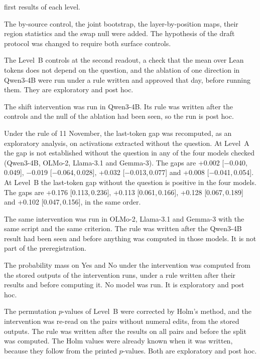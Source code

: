 \documentclass[10pt]{article}
\newcommand{\ic}[2]{[#1,\,#2]}
\begin{document}
\begin{description}[leftmargin=1.2em]
first results of each level.
\item[9 Nov] The by-source control, the joint bootstrap, the layer-by-position maps, their region statistics and
the swap null were added. The hypothesis of the draft protocol was changed to require both surface controls.
\item[11 Nov] The Level~B controls at the second readout, a check that the mean over Lean tokens does not depend on
the question, and the ablation of one direction in Qwen3-4B were run under a rule written and approved that day,
before running them. They are exploratory and post hoc.
\item[11--12 Nov] The shift intervention was run in Qwen3-4B. Its rule was written after the controls and the null of
the ablation had been seen, so the run is post hoc.
\item[12 Nov] Under the rule of 11 November, the last-token gap was recomputed, as an exploratory analysis, on activations
extracted without the question. At Level~A the gap is not established without the question in any of the four models checked (Qwen3-4B, OLMo-2, Llama-3.1 and Gemma-3). The gaps are +0.002
\ic{−0.040}{0.049}, −0.019 \ic{−0.064}{0.028}, +0.032 \ic{−0.013}{0.077} and +0.008 \ic{−0.041}{0.054}. At Level~B the last-token gap without the question is positive in the four models. The gaps are +0.176 \ic{0.113}{0.236}, +0.113 \ic{0.061}{0.166}, +0.128 \ic{0.067}{0.189} and +0.102 \ic{0.047}{0.156}, in the same order.
\item[12--13 Nov] The same intervention was run in OLMo-2, Llama-3.1 and Gemma-3 with the same script and the same
criterion. The rule was written after the Qwen3-4B result had been seen and before anything was computed in those
models. It is not part of the preregistration.
\item[13 Nov] The probability mass on Yes and No under the intervention was computed from the stored outputs of the
intervention runs, under a rule written after their results and before computing it. No model was run. It is
exploratory and post hoc.
\item[13 Nov] The permutation $p$-values of Level~B were corrected by Holm's method, and the intervention was re-read
on the pairs without numeral edits, from the stored outputs. The rule was written after the results on all pairs and
before the split was computed. The Holm values were already known when it was written, because they follow from the
printed $p$-values. Both are exploratory and post hoc.
\end{description}
\end{document}

